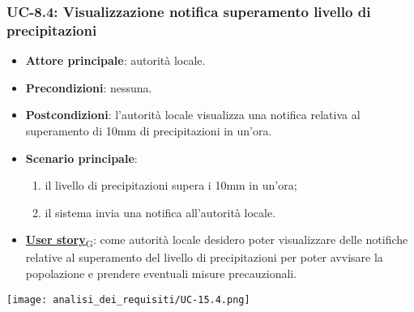 \subsubsection{UC-8.4: Visualizzazione notifica superamento livello di precipitazioni}
\begin{itemize}
	\item \textbf{Attore principale}: autorità locale.
	\item \textbf{Precondizioni}: nessuna.
	\item \textbf{Postcondizioni}: l'autorità locale visualizza una notifica relativa al superamento di 10mm di precipitazioni in un'ora.
	\item \textbf{Scenario principale}:
	      \begin{enumerate}
		      \item il livello di precipitazioni supera i 10mm in un'ora;
		      \item il sistema invia una notifica all'autorità locale.
	      \end{enumerate}
	\item \href{https://7last.github.io/docs/rtb/documentazione-interna/glossario\#user-story}{\textbf{User story}\textsubscript{G}}:
	      come autorità locale desidero poter visualizzare delle notifiche relative al superamento del livello di precipitazioni
	      per poter avvisare la popolazione e prendere eventuali misure precauzionali.
\end{itemize}
\begin{center}
	\texttt{[image: analisi\_dei\_requisiti/UC-15.4.png]}
\end{center}
